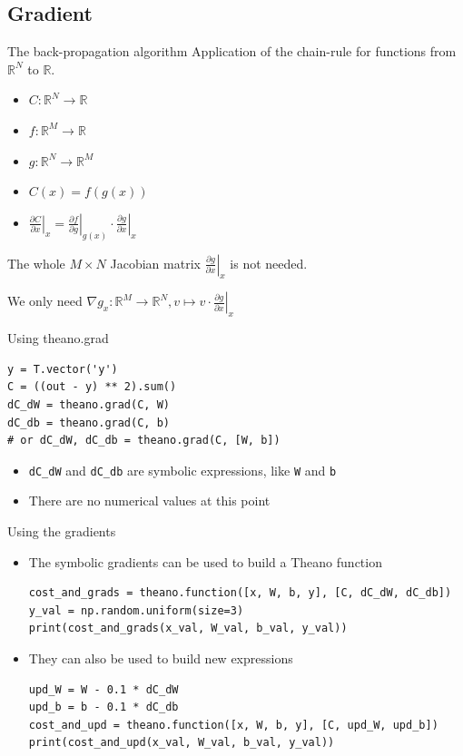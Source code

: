 \documentclass[a4paper,9pt]{beamer}
\begin{document}
\subsection{Gradient}
\begin{frame}{The back-propagation algorithm}
  Application of the chain-rule for functions from ${\mathbb R}^N$ to ${\mathbb R}$.
  \begin{itemize}
    \item $C: {\mathbb R}^N \rightarrow {\mathbb R}$
    \item $f: {\mathbb R}^M \rightarrow {\mathbb R}$
    \item $g: {\mathbb R}^N \rightarrow {\mathbb R}^M$
    \item $C(x) = f(g(x))$
    \item $\left.\frac{\partial C}{\partial x}\right|_x =
              \left.\frac{\partial f}{\partial g}\right|_{g(x)}
              \cdot \left.\frac{\partial g}{\partial x}\right|_x$
  \end{itemize}
  The whole $M \times N$ Jacobian matrix $\left.\frac{\partial g}{\partial x}\right|_x$
  is not needed.

  We only need $\nabla g_x: {\mathbb R}^M \rightarrow {\mathbb R}^N, v \mapsto v \cdot \left.\frac{\partial g}{\partial x}\right|_x$
\end{frame}

\begin{frame}[fragile]{Using theano.grad}
  \begin{verbatim}
y = T.vector('y')
C = ((out - y) ** 2).sum()
dC_dW = theano.grad(C, W)
dC_db = theano.grad(C, b)
# or dC_dW, dC_db = theano.grad(C, [W, b])
  \end{verbatim}
  \begin{itemize}
    \item \verb|dC_dW| and \verb|dC_db| are symbolic expressions, like \verb|W| and \verb|b|
    \item There are no numerical values at this point
  \end{itemize}
\end{frame}

\begin{frame}[fragile]{Using the gradients}
  \begin{itemize}
    \item The symbolic gradients can be used to build a Theano function
      \begin{verbatim}
cost_and_grads = theano.function([x, W, b, y], [C, dC_dW, dC_db])
y_val = np.random.uniform(size=3)
print(cost_and_grads(x_val, W_val, b_val, y_val))
      \end{verbatim}
    \item They can also be used to build new expressions
      \begin{verbatim}
upd_W = W - 0.1 * dC_dW
upd_b = b - 0.1 * dC_db
cost_and_upd = theano.function([x, W, b, y], [C, upd_W, upd_b])
print(cost_and_upd(x_val, W_val, b_val, y_val))
      \end{verbatim}
  \end{itemize}
\end{frame}
\end{document}
